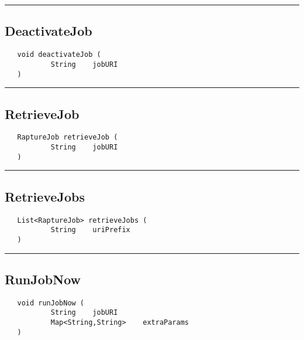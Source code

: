 \rule{15cm}{2pt}
\subsection{DeactivateJob}
\label{Api:DeactivateJob}
\begin{verbatim}
   void deactivateJob (
           String    jobURI
   )
\end{verbatim}



\rule{15cm}{2pt}
\subsection{RetrieveJob}
\label{Api:RetrieveJob}
\begin{verbatim}
   RaptureJob retrieveJob (
           String    jobURI
   )
\end{verbatim}



\rule{15cm}{2pt}
\subsection{RetrieveJobs}
\label{Api:RetrieveJobs}
\begin{verbatim}
   List<RaptureJob> retrieveJobs (
           String    uriPrefix
   )
\end{verbatim}



\rule{15cm}{2pt}
\subsection{RunJobNow}
\label{Api:RunJobNow}
\begin{verbatim}
   void runJobNow (
           String    jobURI
           Map<String,String>    extraParams
   )
\end{verbatim}



